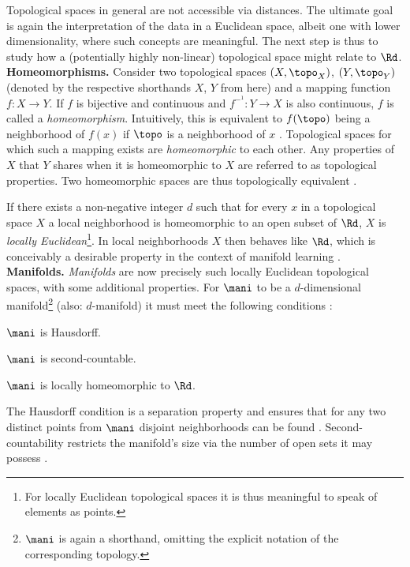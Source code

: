 Topological spaces in general are not accessible via distances.
The ultimate goal is again the interpretation of the data in a Euclidean space, 
albeit one with lower dimensionality, where such concepts are meaningful.
The next step is thus to study how a (potentially highly non-linear) topological 
space might relate to $\Rd$.
\\

\textbf{Homeomorphisms.} Consider two topological spaces $(X, \topo_X)$, 
$(Y, \topo_Y)$ (denoted by the respective shorthands $X$, $Y$ from here) and a 
mapping function $f: X \rightarrow Y$. 
If $f$ is bijective and continuous and $f^{-^1}: Y \rightarrow X$ is also 
continuous, $f$ is called a \textit{homeomorphism}.
Intuitively, this is equivalent to $f(\topo)$ being a neighborhood of $f(x)$ if
$\topo$ is a neighborhood of $x$ \citep{brown2006}.
Topological spaces for which such a mapping exists are \textit{homeomorphic} to
each other. 
Any properties of $X$ that $Y$ shares when it is homeomorphic to $X$ are 
referred to as topological properties. 
Two homeomorphic spaces are thus topologically equivalent \citep{mccleary2006}.

If there exists a non-negative integer $d$ such that for every $x$ in a 
topological space $X$ a local neighborhood is homeomorphic to an open subset of 
$\Rd$, $X$ is \textit{locally Euclidean}\footnote{
For locally Euclidean topological spaces it is thus meaningful to speak of
elements as points.
}.
In local neighborhoods $X$ then behaves like $\Rd$, which is conceivably a 
desirable property in the context of manifold learning \citep{mafu2011}.
\\

\textbf{Manifolds.} \textit{Manifolds} are now precisely such locally Euclidean
topological spaces, with some additional properties.
For $\mani$ to be a $d$-dimensional manifold\footnote{
$\mani$ is again a shorthand, omitting the explicit notation of the 
corresponding topology. 
} (also: $d$-manifold) it must meet 
the following conditions \citep{waldmann2014}:

\begin{tight_enumerate}
  \item $\mani$ is Hausdorff.
  \item $\mani$ is second-countable.
  \item $\mani$ is locally homeomorphic to $\Rd$.
\end{tight_enumerate}

The Hausdorff condition is a separation property and ensures that for any two 
distinct points from $\mani$ disjoint neighborhoods can be found 
\citep{brown2006}.
Second-countability restricts the manifold's size via the number of open sets 
it may possess \citep{waldmann2014}.


